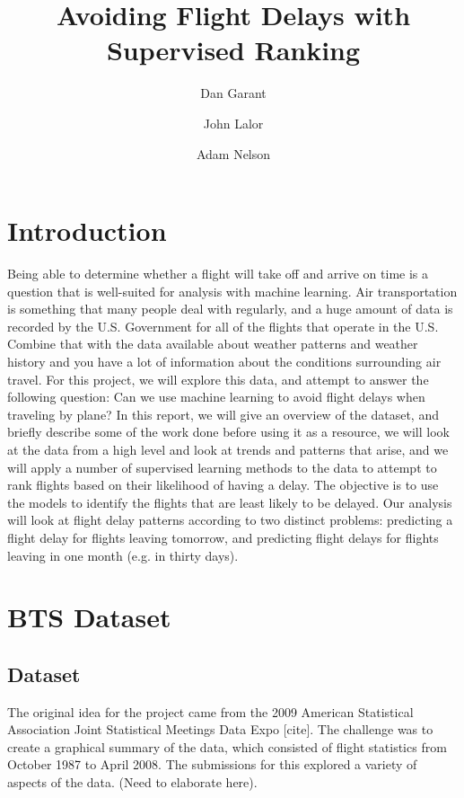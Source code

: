 \documentclass{article}
\title{Avoiding Flight Delays with Supervised Ranking}
\author{Dan Garant \and John Lalor \and Adam Nelson}
\date{}
\begin{document}
\maketitle

\begin{abstract}

\end{abstract}

\section{Introduction}

Being able to determine whether a flight will take off and arrive on time is a question that is well-suited for analysis with machine learning. Air transportation is something that many people deal with regularly, and a huge amount of data is recorded by the U.S. Government for all of the flights that operate in the U.S. Combine that with the data available about weather patterns and weather history and you have a lot of information about the conditions surrounding air travel. For this project, we will explore this data, and attempt to answer the following question: Can we use machine learning to avoid flight delays when traveling by plane? In this report, we will give an overview of the dataset, and briefly describe some of the work done before using it as a resource, we will look at the data from a high level and look at trends and patterns that arise, and we will apply a number of supervised learning methods to the data to attempt to rank flights based on their likelihood of having a delay. The objective is to use the models to identify the flights that are least likely to be delayed. Our analysis will look at flight delay patterns according to two distinct problems: predicting a flight delay for flights leaving tomorrow, and predicting flight delays for flights leaving in one month (e.g. in thirty days).

\section{BTS Dataset}
\subsection{Dataset}

The original idea for the project came from the 2009 American Statistical Association Joint Statistical Meetings Data Expo [cite]. The challenge was to create a graphical summary of the data, which consisted of flight statistics from October 1987 to April 2008. The submissions for this explored a variety of aspects of the data. (Need to elaborate here).
\end{document}
